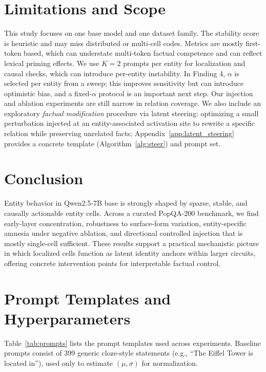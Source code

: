 \documentclass[10pt,twocolumn]{article}
\begin{document}
\section{Limitations and Scope}
This study focuses on one base model and one dataset family. The stability score is heuristic and may miss distributed or multi-cell codes. Metrics are mostly first-token based, which can understate multi-token factual competence and can reflect lexical priming effects. We use $K{=}2$ prompts per entity for localization and causal checks, which can introduce per-entity instability. In Finding 4, $\alpha$ is selected per entity from a sweep; this improves sensitivity but can introduce optimistic bias, and a fixed-$\alpha$ protocol is an important next step. Our injection and ablation experiments are still narrow in relation coverage. We also include an exploratory \emph{factual modification} procedure via latent steering: optimizing a small perturbation injected at an entity-associated activation site to rewrite a specific relation while preserving unrelated facts; Appendix~\ref{app:latent_steering} provides a concrete template (Algorithm~\ref{alg:steer}) and prompt set.

\section{Conclusion}
Entity behavior in Qwen2.5-7B base is strongly shaped by sparse, stable, and causally actionable entity cells. Across a curated PopQA-200 benchmark, we find early-layer concentration, robustness to surface-form variation, entity-specific amnesia under negative ablation, and directional controlled injection that is mostly single-cell sufficient. These results support a practical mechanistic picture in which localized cells function as latent identity anchors within larger circuits, offering concrete intervention points for interpretable factual control.




\clearpage
\appendix

\section{Prompt Templates and Hyperparameters}
\label{app:prompts}
Table~\ref{tab:prompts} lists the prompt templates used across experiments. Baseline prompts consist of 399 generic cloze-style statements (e.g., ``The Eiffel Tower is located in''), used only to estimate $(\mu,\sigma)$ for normalization.
\end{document}
